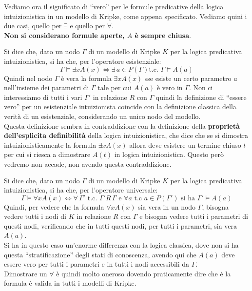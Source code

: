 \documentclass[a4paper,12pt, oneside]{book}
\begin{document}
Vediamo ora il significato di ``vero'' per le formule predicative della logica
intuizionistica in un modello di Kripke, come appena specificato. Vediamo quini
i due casi, quello per $\exists$ e quello per $\forall$. \\
\textbf{Non si considerano formule aperte, $A$ è sempre chiusa}.
\begin{definizione}
  Si dice che, dato un nodo $\Gamma$ di un modello di Kripke $K$ per la logica
  predicativa intuizionistica, si ha che, per l'operatore esistenziale:
  \[\Gamma\vDash \exists xA(x)\iff \exists\, a\in P(\Gamma)\mbox{
      t.c. }\Gamma\vDash A(a)\]
  Quindi nel nodo $\Gamma$ è vera la formula $\exists xA(x)$ sse esiste un certo
  parametro $a$ nell'insieme dei parametri di $\Gamma$ tale per cui $A(a)$ è
  vero in $\Gamma$. Non ci interessiamo di tutti i vari $\Gamma'$ in relazione
  $R$ con $\Gamma$ quindi la definizione di ``essere vero'' per un esistenziale
  intuizionista coincide con la definizione classica della verità di un
  esistenziale, considerando un unico nodo del modello.\\
  Questa definizione sembra in contraddizione con la definizione della
  \textbf{proprietà dell'esplicita definibilità} della 
  logica intuizionistica, che dice che se si dimostra intuizionisticamente la
  formula $\exists x A(x)$ allora deve esistere un termine chiuso $t$ per cui si
  riesca a dimostrare $A(t)$ in logica intuizionistica. Questo però vedremo non
  accade, non avendo questa contraddizione.
\end{definizione}
\begin{definizione}
  Si dice che, dato un nodo $\Gamma$ di un modello di Kripke $K$ per la logica
  predicativa intuizionistica, si ha che, per l'operatore universale:
  \[\Gamma\vDash \forall xA(x)\iff \forall \,\Gamma' \mbox{ t.c. }\Gamma'
    R\,\Gamma \mbox{ e } \forall a \mbox{ t.c }a\in P(\Gamma')\mbox{ si ha }
    \Gamma'\vDash A(a)\]
  Quindi, per vedere che la formula $\forall xA(x)$ sia vera in un nodo
  $\Gamma$, bisogna vedere tutti i nodi di $K$ in relazione $R$ con $\Gamma$ e
  bisogna vedere tutti i parametri di questi nodi, verificando che in tutti
  questi nodi, per tutti i parametri, sia vera $A(a)$.\\
  Si ha in questo caso un'enorme differenza con la logica classica, dove non si
  ha questa ``stratificazione'' degli stati di conoscenza, avendo qui che
  $A(a)$ deve essere vero per tutti i parametri e in tutti i nodi accessibili
  da $\Gamma$.\\
  Dimostrare un $\forall$ è quindi molto oneroso dovendo praticamente dire che è
  la formula è valida in tutti i modelli di Kripke.
\end{definizione}
\end{document}
